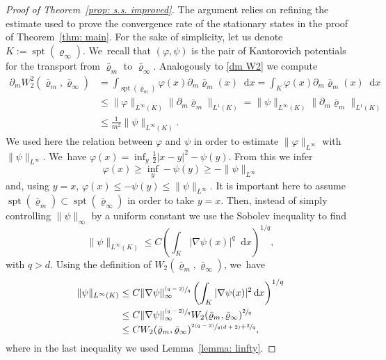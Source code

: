\documentclass[11pt]{article}
\numberwithin{equation}{section}
\newcommand{\psfrac}[2]{\sfrac{(#1)}{#2}}
\DeclareMathOperator{\spt}{spt}
\newcommand{\dx}[1]{\mathop{}\!\mathrm{d} #1}
\theoremstyle{plain}
\theoremstyle{remark}
\begin{document}
\begin{proof}[Proof of Theorem~\ref{prop: s.s. improved}]

The argument relies on refining the estimate used to prove the convergence rate of the stationary states in the proof of Theorem~\ref{thm: main}. For the sake of simplicity, let us denote $K:=\spt(\varrho_\infty)$. We~recall that $(\varphi,\psi)$ is the pair of Kantorovich potentials for the transport from $\bar\varrho_m$ to $\bar\varrho_\infty$. Analogously to \eqref{dm W2} we compute
\begin{equation}\label{dm W2 new}
\begin{aligned}
\partial_m W_2^2(\bar\varrho_m, \bar\varrho_\infty)&= \int_{\spt{(\bar\varrho_m)}} \varphi (x) \partial_m \bar\varrho_m(x) \dx x= \int_{K} \varphi (x) \partial_m \bar\varrho_m(x) \dx x\\
&\leq \|\varphi\|_{L^\infty(K)} \|\partial_m \bar\varrho_m\|_{L^1(K)}=\|\psi\|_{L^\infty(K)} \|\partial_m \bar\varrho_m\|_{L^1(K)}\\
&\leq \frac{1}{m^2} \|\psi\|_{L^\infty(K)}.
\end{aligned}
\end{equation}
We used here the relation between $\varphi$ and $\psi $ in order to estimate $\|\varphi\|_{L^\infty}$ with $\|\psi\|_{L^\infty}$. We~have $\varphi(x)=\inf_y \frac12|x-y|^2-\psi(y)$. From this we infer
\[
\varphi(x)\geq \inf_y-\psi(y)\geq -\|\psi\|_{L^\infty}
\]
and, using $y=x$, $\varphi(x)\leq-\psi(y)\leq \|\psi\|_{L^\infty}$. It is important here to assume $\spt(\bar\varrho_m)\subset\spt (\bar\varrho_\infty)$ in order to take $y=x$. Then, instead of simply controlling $\|\psi\|_\infty$ by a uniform constant we use the Sobolev inequality to find
\begin{equation*}
\|\psi\|_{L^\infty(K)} \leq C \left(\int_{K} |\nabla \psi(x)|^{q} \dx x\right)^{1/{ q}},
\end{equation*}
with ${q}>d$. Using the definition of $W_2(\bar\varrho_m,\bar\varrho_\infty)$, we~have
\begin{align*}
\|\psi\|_{L^\infty(K)} &\leq {C}\|\nabla \psi\|_\infty^{\psfrac{{ q}-2}{{q}}} \left(\int_{K} |\nabla \psi(x)|^2 \dx x\right)^{1/{q}}\\
&\leq {C}\|\nabla \psi\|_\infty^{\psfrac{{ q}-2}{{q}}} W_2(\bar\varrho_m,\bar\varrho_\infty)^{\sfrac 2{q}}\\
&\leq { C}W_2(\bar\varrho_m,\bar\varrho_\infty)^{\sfrac{2({ q}-2)}{{ q}(d+2)} +\sfrac 2{ q}},
\end{align*}
where in the last inequality we used Lemma~\ref{lemma: linfty}.

\end{proof}
\end{document}
